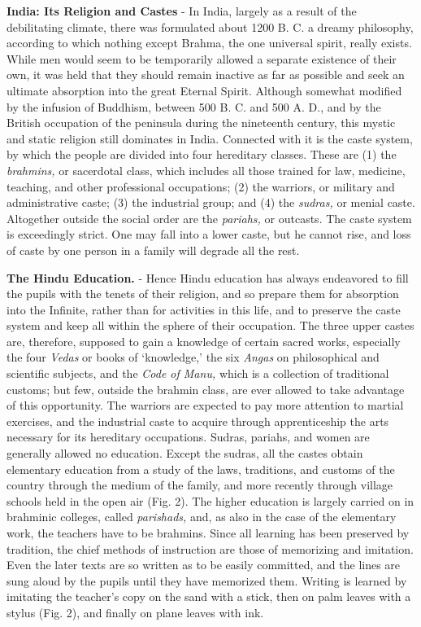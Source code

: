 \documentclass[]{book}
\begin{document}
\textbf{India: Its Religion and Castes} - In India, largely as a result of the debilitating climate, there was formulated about 1200 B. C. a dreamy philosophy, according to which nothing except Brahma, the one universal spirit, really exists. While men would seem to be temporarily allowed a separate existence of their own, it was held that they should remain inactive as far as possible and seek an ultimate absorption into the great Eternal Spirit. Although somewhat modified by the infusion of Buddhism, between 500 B. C. and 500 A. D., and by the British occupation of the peninsula during the nineteenth century, this mystic and static religion still dominates in India. Connected with it is the caste system, by which the people are divided into four hereditary classes. These are (1) the \emph{brahmins,} or sacerdotal class, which includes all those trained for law, medicine, teaching, and other professional occupations; (2) the warriors, or military and administrative caste; (3) the industrial group; and (4) the \emph{sudras,} or menial caste. Altogether outside the social order are the \emph{pariahs,} or outcasts. The caste system is exceedingly strict. One may fall into a lower caste, but he cannot rise, and loss of caste by one person in a family will degrade all the rest.

\textbf{The Hindu Education.} - Hence Hindu education has always endeavored to fill the pupils with the tenets of their religion, and so prepare them for absorption into the Infinite, rather than for activities in this life, and to preserve the caste system and keep all within the sphere of their occupation. The three upper castes are, therefore, supposed to gain a knowledge of certain sacred works, especially the four \emph{Vedas} or books of `knowledge,' the six \emph{Angas} on philosophical and scientific subjects, and the \emph{Code of Manu,} which is a collection of traditional customs; but few, outside the brahmin class, are ever allowed to take advantage of this opportunity. The warriors are expected to pay more attention to martial exercises, and the industrial caste to acquire through apprenticeship the arts necessary for its hereditary occupations. Sudras, pariahs, and women are generally allowed no education. Except the sudras, all the castes obtain elementary education from a study of the laws, traditions, and customs of the country through the medium of the family, and more recently through village schools held in the open air (Fig. 2). The higher education is largely carried on in brahminic colleges, called \emph{parishads,} and, as also in the case of the elementary work, the teachers have to be brahmins. Since all learning has been preserved by tradition, the chief methods of instruction are those of memorizing and imitation. Even the later texts are so written as to be easily committed, and the lines are sung aloud by the pupils until they have memorized them. Writing is learned by imitating the teacher's copy on the sand with a stick, then on palm leaves with a stylus (Fig. 2), and finally on plane leaves with ink.
\end{document}
